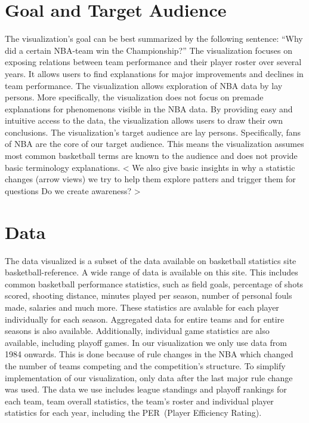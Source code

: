 \documentclass{sigchi}
\begin{document}
\section{Goal and Target Audience}\label{sec:goal} 
The visualization's goal can be best summarized by the following sentence: ``Why
did a certain NBA-team win the Championship?'' The visualization focuses on exposing relations between team
performance and their player roster over several years. It allows users to find
explanations for major improvements and declines in team performance.  The
visualization allows exploration of NBA data by lay persons.  More specifically,
the visualization does not focus on premade explanations for phenomenons
visible in the NBA data. By providing easy and intuitive access to the data, the
visualization allows users to draw their own conclusions. The visualization's
target audience are lay persons. Specifically, fans of NBA are the core of our
target audience. This means the visualization assumes most common basketball
terms are known to the audience and does not provide basic terminology
explanations. 
< We also give basic insights in why a statistic changes (arrow views)
we try to help them explore patters and trigger them for questions
Do we create awareness?
>

\section{Data}\label{sec:data}
The data visualized is a subset of the data available on basketball statistics
site basketball-reference\cite{basketball-reference}. A wide range of data is
available on this site. This includes common basketball performance statistics,
such as field goals, percentage of shots scored, shooting distance, minutes
played per season, number of personal fouls made, salaries and much more. These
statistics are avalable for each player individually for each season. Aggregated
data for entire teams and for entire seasons is also available. Additionally,
individual game statistics are also available, including playoff games.  In our
visualization we only use data from 1984 onwards. This is done because of rule
changes in the NBA which changed the number of teams competing and the
competition's structure. To simplify implementation of our visualization, only
data after the last major rule change was used.  The data we use includes league
standings and playoff rankings for each team, team overall statistics, the
team's roster and individual player statistics for each year, including the
PER~(Player Efficiency Rating)\cite{per}. 
\end{document}
